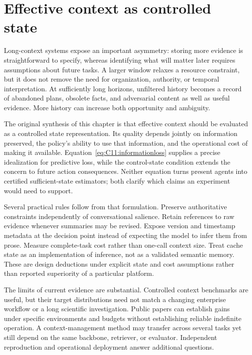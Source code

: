 \section{Effective context as controlled state}\label{sec:C11:implications}
Long-context systems expose an important asymmetry: storing more evidence is straightforward to specify, whereas identifying what will matter later requires assumptions about future tasks. A larger window relaxes a resource constraint, but it does not remove the need for organization, authority, or temporal interpretation. At sufficiently long horizons, unfiltered history becomes a record of abandoned plans, obsolete facts, and adversarial content as well as useful evidence. More history can increase both opportunity and ambiguity.

The original synthesis of this chapter is that effective context should be evaluated as a controlled state representation. Its quality depends jointly on information preserved, the policy's ability to use that information, and the operational cost of making it available. Equation~\eqref{eq:C11:informationloss} supplies a precise idealization for predictive loss, while the control-state condition extends the concern to future action consequences. Neither equation turns present agents into certified sufficient-state estimators; both clarify which claims an experiment would need to support.

Several practical rules follow from that formulation. Preserve authoritative constraints independently of conversational salience. Retain references to raw evidence whenever summaries may be revised. Expose version and timestamp metadata at the decision point instead of expecting the model to infer them from prose. Measure complete-task cost rather than one-call context size. Treat cache state as an implementation of inference, not as a validated semantic memory. These are design deductions under explicit state and cost assumptions rather than reported superiority of a particular platform.

The limits of current evidence are substantial. Controlled context benchmarks are useful, but their target distributions need not match a changing enterprise workflow or a long scientific investigation. Public papers can establish gains under specific environments and budgets without establishing reliable indefinite operation. A context-management method may transfer across several tasks yet still depend on the same backbone, retriever, or evaluator. Independent reproduction and operational deployment answer additional questions.


